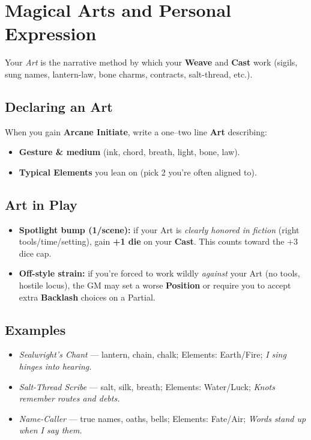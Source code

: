 \section{Magical Arts and Personal Expression}

Your \emph{Art} is the narrative method by which your \textbf{Weave} and \textbf{Cast} work (sigils, sung names, lantern-law, bone charms, contracts, salt-thread, etc.).

\subsection{Declaring an Art}
When you gain \textbf{Arcane Initiate}, write a one–two line \textbf{Art} describing:
\begin{itemize}
  \item \textbf{Gesture \& medium} (ink, chord, breath, light, bone, law).
  \item \textbf{Typical Elements} you lean on (pick 2 you're often aligned to).
\end{itemize}

\subsection{Art in Play}
\begin{itemize}
  \item \textbf{Spotlight bump (1/scene):} if your Art is \emph{clearly honored in fiction} (right tools/time/setting), gain \textbf{+1 die} on your \textbf{Cast}. This counts toward the +3 dice cap.
  \item \textbf{Off-style strain:} if you're forced to work wildly \emph{against} your Art (no tools, hostile locus), the GM may set a worse \textbf{Position} or require you to accept extra \textbf{Backlash} choices on a Partial.
\end{itemize}

\subsection{Examples}
\begin{itemize}
  \item \emph{Sealwright's Chant} — lantern, chain, chalk; Elements: Earth/Fire; \textit{I sing hinges into hearing.}
  \item \emph{Salt-Thread Scribe} — salt, silk, breath; Elements: Water/Luck; \textit{Knots remember routes and debts.}
  \item \emph{Name-Caller} — true names, oaths, bells; Elements: Fate/Air; \textit{Words stand up when I say them.}
\end{itemize}

